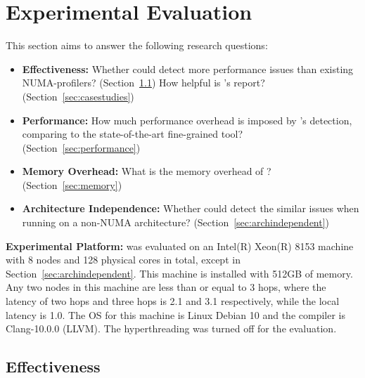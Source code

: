 \section{Experimental Evaluation}
\label{sec:evaluation}

This section aims to answer the following research questions: 

\begin{itemize}
\item \textbf{Effectiveness:} Whether \NP{} could detect more performance issues than existing NUMA-profilers? (Section~\ref{effectiveness}) How helpful is \NP{}'s report? (Section~\ref{sec:casestudies})
\item \textbf{Performance:} How much performance overhead is imposed by \NP{}'s detection, comparing to the state-of-the-art fine-grained tool? (Section~\ref{sec:performance}) 
\item \textbf{Memory Overhead:} What is the memory overhead of \NP{}? (Section~\ref{sec:memory})
\item \textbf{Architecture Independence:} Whether \NP{} could detect the similar issues when running on a non-NUMA architecture? (Section~\ref{sec:archindependent})	
\end{itemize}


\textbf{Experimental Platform:}  \NP{} was evaluated on an Intel(R) Xeon(R) 8153 machine with 8 nodes and 128 physical cores in total, except in Section~\ref{sec:archindependent}. This machine is installed with 512GB of memory. Any two nodes in this machine are less than or equal to 3 hops, where the latency of two hops and three hops is 2.1 and 3.1 respectively, while the local latency is 1.0. The OS for this machine is Linux Debian 10 and the compiler is Clang-10.0.0 (LLVM).  The hyperthreading was turned off for the evaluation.


\subsection{Effectiveness}
\label{effectiveness}
%



